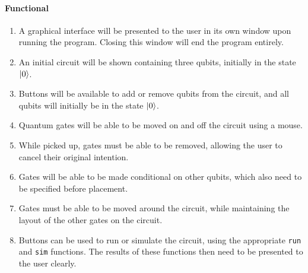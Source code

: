 \documentclass[a4paper,10pt, titlepage, twoside]{article}
\begin{document}
\paragraph{Functional}
\begin{enumerate}
        \item A graphical interface will be presented to the user in its own window upon running the program. Closing this window will end the program entirely.
        \item An initial circuit will be shown containing three qubits, initially in the state $\ket 0$.
        \item Buttons will be available to add or remove qubits from the circuit, and all qubits will initially be in the state $\ket 0$.
        \item Quantum gates will be able to be moved on and off the circuit using a mouse.
        \item While picked up, gates must be able to be removed, allowing the user to cancel their original intention.
        \item Gates will be able to be made conditional on other qubits, which also need to be specified before placement.
        \item Gates must be able to be moved around the circuit, while maintaining the layout of the other gates on the circuit.
        \item Buttons can be used to run or simulate the circuit, using the appropriate \texttt{run} and \texttt{sim} functions. The results of these functions then need to be presented to the user clearly.
\end{enumerate}
\end{document}
